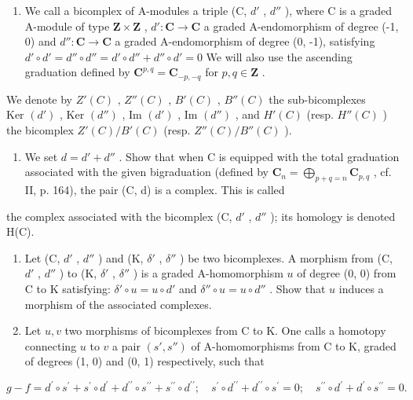 \begin{enumerate}
\def\labelenumi{\arabic{enumi})}
\setcounter{enumi}{10}
\tightlist
\item
  We call a bicomplex of A-modules a triple (C, \(d'\) , \(d''\) ), where C is a graded A-module of type \(\mathbf{Z} \times \mathbf{Z}\) , \(d': \mathbf{C} \to \mathbf{C}\) a graded A-endomorphism of degree (-1, 0) and \(d'': \mathbf{C} \to \mathbf{C}\) a graded A-endomorphism of degree (0, -1), satisfying \(d' \circ d' = d'' \circ d'' = d' \circ d'' + d'' \circ d' = 0\) We will also use the ascending graduation defined by \(\mathbf{C}^{p,q} = \mathbf{C}_{-p,-q}\) for \(p, q \in \mathbf{Z}\) .
\end{enumerate}

We denote by \(Z'(C)\) , \(Z''(C)\) , \(B'(C)\) , \(B''(C)\) the sub-bicomplexes \(\text{Ker } (d')\) , \(\text{Ker } (d'')\) , \(\text{Im } (d')\) , \(\text{Im } (d'')\) , and \(H'(C)\) (resp. \(H''(C)\) ) the bicomplex \(Z'(C)/B'(C)\) (resp. \(Z''(C)/B''(C)\) ).

\begin{enumerate}
\def\labelenumi{\alph{enumi})}
\tightlist
\item
  We set \(d = d' + d''\) . Show that when C is equipped with the total graduation associated with the given bigraduation (defined by \(\mathbf{C}_n = \bigoplus_{p+q=n} \mathbf{C}_{p,q}\) , cf. II, p. 164), the pair (C, d) is a complex. This is called
\end{enumerate}

the complex associated with the bicomplex (C, \(d'\) , \(d''\) ); its homology is denoted H(C).

\begin{enumerate}
\def\labelenumi{\alph{enumi})}
\setcounter{enumi}{1}
\item
  Let (C, \(d'\) , \(d''\) ) and (K, \(\delta'\) , \(\delta''\) ) be two bicomplexes. A morphism from (C, \(d'\) , \(d''\) ) to (K, \(\delta'\) , \(\delta''\) ) is a graded A-homomorphism \(u\) of degree (0, 0) from C to K satisfying: \(\delta'\circ u = u \circ d'\) and \(\delta''\circ u = u \circ d''\) . Show that \(u\) induces a morphism of the associated complexes.
\item
  Let \(u, v\) two morphisms of bicomplexes from C to K. One calls a homotopy connecting \(u\) to \(v\) a pair \((s', s'')\) of A-homomorphisms from C to K, graded of degrees (1, 0) and (0, 1) respectively, such that
\end{enumerate}

\[
g - f = d ^ {\prime} \circ s ^ {\prime} + s ^ {\prime} \circ d ^ {\prime} + d ^ {\prime \prime} \circ s ^ {\prime \prime} + s ^ {\prime \prime} \circ d ^ {\prime \prime}; \quad s ^ {\prime} \circ d ^ {\prime \prime} + d ^ {\prime \prime} \circ s ^ {\prime} = 0; \quad s ^ {\prime \prime} \circ d ^ {\prime} + d ^ {\prime} \circ s ^ {\prime \prime} = 0.
\]

